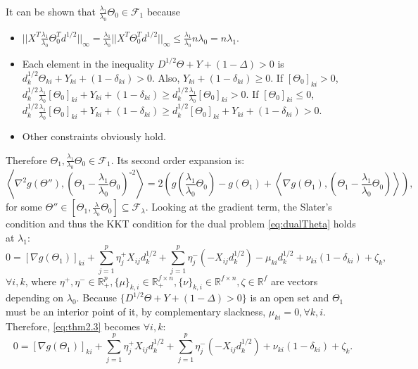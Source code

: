 It can be shown that $\frac{\lambda_1}{\lambda_0}\Theta_{0}\in\mathcal{F}_{1}$ because
\begin{itemize}
    \item $||X^T\frac{\lambda_1}{\lambda_0}\Theta_{0}^Td^{1/2}||_\infty=\frac{\lambda_1}{\lambda_0}||X^T\Theta_{0}^Td^{1/2}||_\infty\leq \frac{\lambda_1}{\lambda_0}n\lambda_0=n\lambda_1$.
    \item Each element in the inequality $D^{1/2}\Theta+Y+(1-\Delta)> 0$ is $d_k^{1/2}\Theta_{ki}+Y_{ki}+(1-\delta_{ki})>0$. Also, $Y_{ki}+(1-\delta_{ki})\geq 0$. If $[\Theta_0]_{ki}>0$, $d_k^{1/2}\frac{\lambda_1}{\lambda_0}[\Theta_0]_{ki}+Y_{ki}+(1-\delta_{ki})\geq d_k^{1/2}\frac{\lambda_1}{\lambda_0}[\Theta_0]_{ki}>0.$ If $[\Theta_0]_{ki}\leq0$, $d_k^{1/2}\frac{\lambda_1}{\lambda_0}[\Theta_0]_{ki}+Y_{ki}+(1-\delta_{ki})\geq d_k^{1/2}[\Theta_0]_{ki}+Y_{ki}+(1-\delta_{ki})>0.$
    \item Other constraints obviously hold.
\end{itemize}
Therefore $\Theta_{1},\frac{\lambda_1}{\lambda_0}\Theta_{0}\in \mathcal{F}_{1}$. Its second order expansion is:
\begin{equation}
    \label{eq:thm2.1}
    \left\langle\nabla^2 g(\Theta''),\left(\Theta_{1}-\frac{\lambda_1}{\lambda_0}\Theta_{0}\right)^{\circ 2}\right\rangle=2\left(g\left(\frac{\lambda_1}{\lambda_0}\Theta_{0}\right)-g(\Theta_{1})+\left\langle\nabla g\left(\Theta_{1}\right),\left(\Theta_{1}-\frac{\lambda_1}{\lambda_0}\Theta_{0}\right)\right\rangle\right),
\end{equation}
 for some $\Theta''\in[\Theta_1,\frac{\lambda}{\lambda_0}\Theta_{0}]\subseteq \mathcal{F}_\lambda$. Looking at the gradient term, the Slater's condition and thus the KKT condition for the dual problem \eqref{eq:dualTheta} holds at $\lambda_1$:
\begin{equation}
    \label{eq:thm2.3}
    0=[\nabla g(\Theta_{1})]_{ki}+\sum_{j=1}^p\eta^+_jX_{ij}d_k^{1/2}+\sum_{j=1}^p\eta^-_j(-X_{ij}d_k^{1/2})-\mu_{ki}d_k^{1/2}+\nu_{ki}(1-\delta_{ki})+\zeta_k,
\end{equation}
$\forall i,k$, where $\eta^+,\eta^-\in\mathbb{R}^p_+,\{\mu\}_{k,i}\in\mathbb{R}^{f\times n}_+,\{\nu\}_{k,i}\in\mathbb{R}^{f\times n},\zeta\in\mathbb{R}^f$ are vectors depending on $\lambda_0$. Because $\{D^{1/2}\Theta+Y+(1-\Delta)>0\}$ is an open set and $\Theta_{1}$ must be an interior point of it, by complementary slackness, $\mu_{ki}=0,\forall k,i$. Therefore, \eqref{eq:thm2.3} becomes $\forall i,k$:
\begin{equation}
    \label{eq:thm2.4}
    0=[\nabla g(\Theta_{1})]_{ki}+\sum_{j=1}^p\eta^+_jX_{ij}d_k^{1/2}+\sum_{j=1}^p\eta^-_j(-X_{ij}d_k^{1/2})+\nu_{ki}(1-\delta_{ki})+\zeta_k.
\end{equation}

